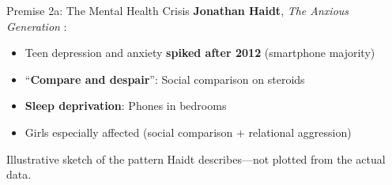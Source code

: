 ﻿\documentclass[aspectratio=169,11pt]{beamer}
\begin{document}
\begin{frame}{Premise 2a: The Mental Health Crisis}
\textbf{Jonathan Haidt}, \textit{The Anxious Generation} \parencite{haidt_anxious_generation}:

\begin{itemize}
    \item Teen depression and anxiety \textbf{spiked after 2012} (smartphone majority)
    \item ``\textbf{Compare and despair}'': Social comparison on steroids
    \item \textbf{Sleep deprivation}: Phones in bedrooms
    \item Girls especially affected (social comparison + relational aggression)
\end{itemize}

\vspace{0.1cm}
\begin{center}

{\scriptsize Illustrative sketch of the pattern Haidt describes---not plotted from the actual data.}
\end{center}
\end{frame}
\end{document}
